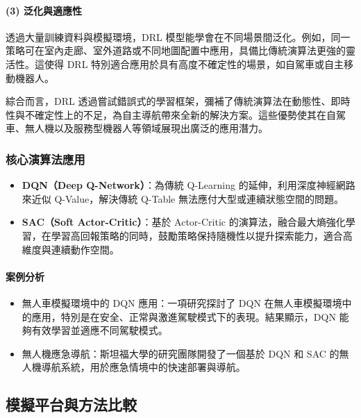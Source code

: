 \documentclass[12pt,a4paper]{article}
\begin{document}
\paragraph{(3) 泛化與適應性}
透過大量訓練資料與模擬環境，DRL 模型能學會在不同場景間泛化。例如，同一策略可在室內走廊、室外道路或不同地圖配置中應用，具備比傳統演算法更強的靈活性。這使得 DRL 特別適合應用於具有高度不確定性的場景，如自駕車或自主移動機器人。
\\ \par
綜合而言，DRL 透過嘗試錯誤式的學習框架，彌補了傳統演算法在動態性、即時性與不確定性上的不足，為自主導航帶來全新的解決方案。這些優勢使其在自駕車、無人機以及服務型機器人等領域展現出廣泛的應用潛力。

\subsubsection{核心演算法應用}
\begin{itemize}
  \item \textbf{DQN（Deep Q-Network）}：為傳統 Q-Learning 的延伸，利用深度神經網路來近似 Q-Value，解決傳統 Q-Table 無法應付大型或連續狀態空間的問題\cite{DQN}。
  \item \textbf{SAC（Soft Actor-Critic）}：基於 Actor-Critic 的演算法，融合最大熵強化學習，在學習高回報策略的同時，鼓勵策略保持隨機性以提升探索能力，適合高維度與連續動作空間\cite{SAC}。
\end{itemize}

\paragraph{案例分析}
\begin{itemize}
  \item 無人車模擬環境中的 DQN 應用：一項研究探討了 DQN 在無人車模擬環境中的應用，特別是在安全、正常與激進駕駛模式下的表現。結果顯示，DQN 能夠有效學習並適應不同駕駛模式\cite{rybchak2024}。
  \item 無人機應急導航：斯坦福大學的研究團隊開發了一個基於 DQN 和 SAC 的無人機導航系統，用於應急情境中的快速部署與導航\cite{greenberg}。
\end{itemize}

\newpage

\iffalse
	\subsection{模擬平台與方法比較}
	
\end{document}
